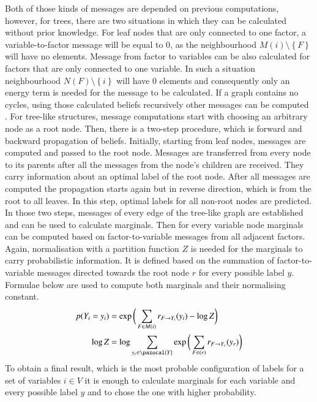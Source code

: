 Both of those kinds of messages are depended on previous computations, however, for trees, there are two situations in which they can be calculated without prior knowledge. For leaf nodes that are only connected to one factor, a variable-to-factor message will be equal to 0, as the neighbourhood $M(i)\setminus{\left \{ F \right \}}$ will have no elements. Message from factor to variables can be also calculated for factors that are only connected to one variable. In such a situation neighbourhood $N(F)\setminus{\left \{ i \right \}}$ will have 0 elements and consequently only an energy term is needed for the message to be calculated. If a graph contains no cycles, using those calculated beliefs recursively other messages can be computed \cite{lbp}. For tree-like structures, message computations start with choosing an arbitrary node as a root node. Then, there is a two-step procedure, which is forward and backward propagation of beliefs. Initially, starting from leaf nodes, messages are computed and passed to the root node. Messages are transferred from every node to its parents after all the messages from the node’s children are received. They carry information about an optimal label of the root node. After all messages are computed the propagation starts again but in reverse direction, which is from the root to all leaves. In this step, optimal labels for all non-root nodes are predicted. In those two steps, messages of every edge of the tree-like graph are established and can be used to calculate marginals. Then for every variable node marginals can be computed based on factor-to-variable messages from all adjacent factors. Again, normalisation with a partition function $Z$ is needed for the marginals to carry probabilistic information. It is defined based on the summation of factor-to-variable messages directed towards the root node $r$ for every possible label $y$. Formulae below are used to compute both marginals and their normalising constant.
\begin{align}
    p(Y_i = y_i) &= \exp{\bigg(\sum_{F \in M(i)}{r_{F\rightarrow Y_i}(y_i)} - \log{Z}\bigg)} \\
    \log{Z} &= \log{\sum_{y_r \in \pazocal{Y}}{
         \exp{\bigg(\sum_{F \in (r)}{r_{F\rightarrow Y_r}(y_r)}\bigg)
     }}}
\end{align}
To obtain a final result, which is the most probable configuration of labels for a set of variables $i \in V$ it is enough to calculate marginals for each variable and every possible label $y$ and to chose the one with higher probability.

